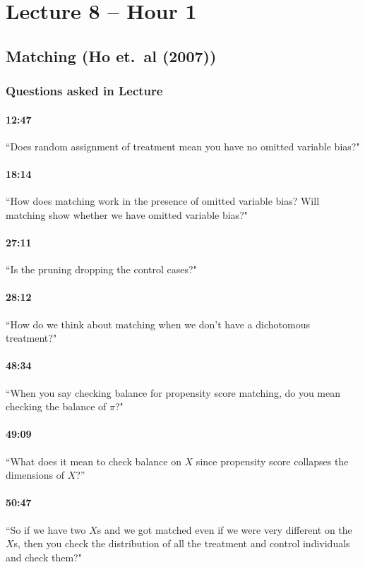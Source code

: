 \documentclass[11pt]{article}
\begin{document}
\section{Lecture 8 -- Hour 1}

\subsection{Matching (Ho et.\ al (2007))}


\subsubsection{Questions asked in Lecture}


\paragraph{12:47} ``Does random assignment of treatment mean you have no omitted variable bias?"

\paragraph{18:14} ``How does matching work in the presence of omitted variable bias?  Will matching show whether we have omitted variable bias?"

\paragraph{27:11} ``Is the pruning dropping the control cases?"

\paragraph{28:12} ``How do we think about matching when we don't have a dichotomous treatment?"

\paragraph{48:34} ``When you say checking balance for propensity score matching, do you mean checking the balance of $\pi$?"

\paragraph{49:09} ``What does it mean to check balance on $X$ since propensity score collapses the dimensions of $X$?''

\paragraph{50:47} ``So if we have two $X$s and we got matched even if we were very different on the $X$s, then you check the distribution of all the treatment and control individuals and check them?"
\end{document}
